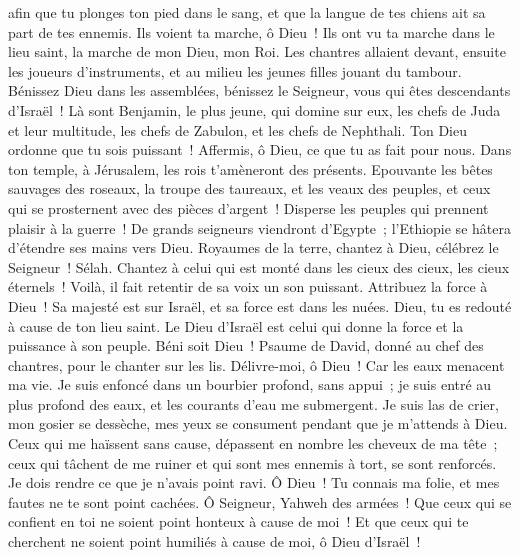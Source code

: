 \begin{multicols}{2}
afin que tu plonges ton pied dans le sang, et que la langue de tes chiens ait sa part de tes ennemis.
Ils voient ta marche, ô Dieu~! Ils ont vu ta marche dans le lieu saint, la marche de mon Dieu, mon Roi.
Les chantres allaient devant, ensuite les joueurs d'instruments, et au milieu les jeunes filles jouant du tambour.
Bénissez Dieu dans les assemblées, bénissez le Seigneur, vous qui êtes descendants d'Israël~!
Là sont Benjamin, le plus jeune, qui domine sur eux, les chefs de Juda et leur multitude, les chefs de Zabulon, et les chefs de Nephthali.
Ton Dieu ordonne que tu sois puissant~! Affermis, ô Dieu, ce que tu as fait pour nous.
Dans ton temple, à Jérusalem, les rois t'amèneront des présents.
Epouvante les bêtes sauvages des roseaux, la troupe des taureaux, et les veaux des peuples, et ceux qui se prosternent avec des pièces d'argent~! Disperse les peuples qui prennent plaisir à la guerre~!
De grands seigneurs viendront d'Egypte~; l'Ethiopie se hâtera d'étendre ses mains vers Dieu.
Royaumes de la terre, chantez à Dieu, célébrez le Seigneur~! Sélah.
Chantez à celui qui est monté dans les cieux des cieux, les cieux éternels~! Voilà, il fait retentir de sa voix un son puissant.
Attribuez la force à Dieu~! Sa majesté est sur Israël, et sa force est dans les nuées.
Dieu, tu es redouté à cause de ton lieu saint. Le Dieu d'Israël est celui qui donne la force et la puissance à son peuple. Béni soit Dieu~!
\VerseOne{}Psaume de David, donné au chef des chantres, pour le chanter sur les lis.
Délivre-moi, ô Dieu~! Car les eaux menacent ma vie.
Je suis enfoncé dans un bourbier profond, sans appui~; je suis entré au plus profond des eaux, et les courants d'eau me submergent.
Je suis las de crier, mon gosier se dessèche, mes yeux se consument pendant que je m'attends à Dieu.
Ceux qui me haïssent sans cause, dépassent en nombre les cheveux de ma tête~; ceux qui tâchent de me ruiner et qui sont mes ennemis à tort, se sont renforcés. Je dois rendre ce que je n'avais point ravi.
Ô Dieu~! Tu connais ma folie, et mes fautes ne te sont point cachées.
Ô Seigneur, Yahweh des armées~! Que ceux qui se confient en toi ne soient point honteux à cause de moi~! Et que ceux qui te cherchent ne soient point humiliés à cause de moi, ô Dieu d'Israël~!

\end{multicols}
